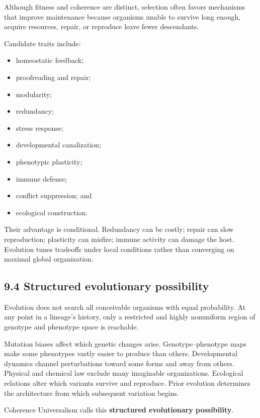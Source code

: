 \documentclass[
  11pt,
]{article}
\providecommand{\tightlist}{%
  \setlength{\itemsep}{0pt}\setlength{\parskip}{0pt}}
\begin{document}
Although fitness and coherence are distinct, selection often favors
mechanisms that improve maintenance because organisms unable to survive
long enough, acquire resources, repair, or reproduce leave fewer
descendants.

Candidate traits include:

\begin{itemize}
\tightlist
\item
  homeostatic feedback;
\item
  proofreading and repair;
\item
  modularity;
\item
  redundancy;
\item
  stress response;
\item
  developmental canalization;
\item
  phenotypic plasticity;
\item
  immune defense;
\item
  conflict suppression; and
\item
  ecological construction.
\end{itemize}

Their advantage is conditional. Redundancy can be costly; repair can
slow reproduction; plasticity can misfire; immune activity can damage
the host. Evolution tunes tradeoffs under local conditions rather than
converging on maximal global organization.

\subsection{9.4 Structured evolutionary
possibility}\label{structured-evolutionary-possibility}

Evolution does not search all conceivable organisms with equal
probability. At any point in a lineage's history, only a restricted and
highly nonuniform region of genotype and phenotype space is reachable.

Mutation biases affect which genetic changes arise. Genotype--phenotype
maps make some phenotypes vastly easier to produce than others.
Developmental dynamics channel perturbations toward some forms and away
from others. Physical and chemical law exclude many imaginable
organizations. Ecological relations alter which variants survive and
reproduce. Prior evolution determines the architecture from which
subsequent variation begins.

Coherence Universalism calls this \textbf{structured evolutionary
possibility}.
\end{document}

